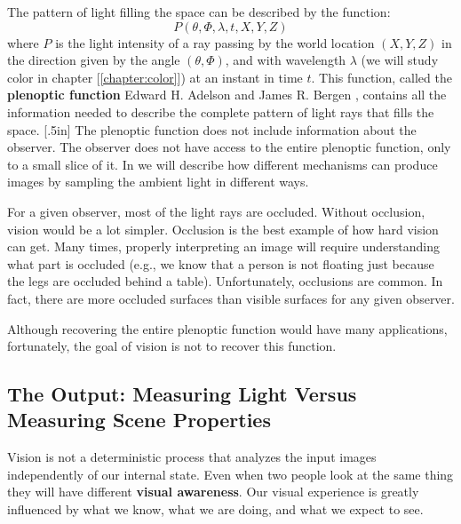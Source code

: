 The pattern of light filling the space can be described by the function:
\begin{equation}
    P (\theta, \Phi, \lambda, t, X, Y, Z)
\end{equation}
where $P$ is the light intensity of a ray passing by the world location $(X,Y,Z)$  in the direction given by the angle $(\theta, \Phi)$, and with wavelength $\lambda$ (we will study color in chapter [\ref{chapter:color}])
at an instant in time $t$. This function, called the {\bf plenoptic function}
Edward H. Adelson
and James R. Bergen \cite{Adelson91}, contains all the information needed to describe the complete pattern of light rays that fills the space.
[.5in]
The plenoptic function does not include information about the observer. The observer does not have access to the entire plenoptic function, only to a small slice of it. In \chap{\ref{chapter:imaging}} we will describe how different mechanisms can produce images by sampling the ambient light in different ways.

For a given observer, most of the light rays are occluded. Without occlusion, vision would be a lot simpler. Occlusion is the best example of how hard vision can get. Many times, properly interpreting an image will require understanding what part is occluded (e.g., we know that a person is not floating just because the legs are occluded behind a table). Unfortunately, occlusions are common. In fact, there are more occluded surfaces than visible surfaces for any given observer.


Although recovering the entire plenoptic function would have many applications, fortunately, the goal of vision is not to recover this function.




\subsection{The Output: Measuring Light Versus Measuring Scene Properties}

Vision is not a deterministic process that analyzes the input images independently of our internal state. Even when two people look at the same thing they will have different {\bf visual awareness}. Our visual experience is greatly influenced by what we know, what we are doing, and what we expect to see.

